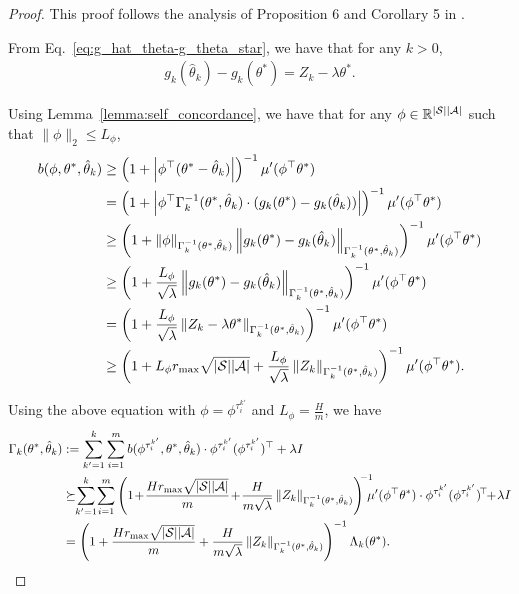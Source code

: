 \begin{proof}
	This proof follows the analysis of Proposition 6 and Corollary 5 in \cite{russac2021self}.
	
	From Eq.~\eqref{eq:g_hat_theta-g_theta_star}, we have that for any $k>0$,
	\begin{align*}
		g_k(\hat{\theta}_k) - g_k(\theta^*) = Z_k -  \lambda \theta^* .
	\end{align*}
	
	Using Lemma~\ref{lemma:self_concordance}, we have that for any $\phi \in \mathbb{R}^{|\mathcal{S}| |\mathcal{A}|}$ such that $\|\phi\|_2 \leq L_{\phi}$, 
	\begin{align*}
		b(\phi,\theta^*,\hat{\theta}_k) &\geq \left(  1+\left| \phi^\top (\theta^*-\hat{\theta}_k) \right|  \right)^{-1} \mu'(\phi^\top \theta^*)
		\\
		&= \left(  1+\left| \phi^\top \Gamma_k^{-1}(\theta^*,\hat{\theta}_k)\cdot (g_k(\theta^*)-g_k(\hat{\theta}_k)) \right|  \right)^{-1} \mu'(\phi^\top \theta^*)
		\\
		&\geq \left(  1+\left\| \phi \right\|_{ \Gamma_k^{-1}(\theta^*,\hat{\theta}_k)}  \left\| g_k(\theta^*)-g_k(\hat{\theta}_k) \right\|_{\Gamma_k^{-1}(\theta^*,\hat{\theta}_k)}  \right)^{-1} \mu'(\phi^\top \theta^*)
		\\
		&\geq \left(  1+\frac{L_{\phi}}{\sqrt{\lambda}} \left\| g_k(\theta^*)-g_k(\hat{\theta}_k) \right\|_{\Gamma_k^{-1}(\theta^*,\hat{\theta}_k)}  \right)^{-1} \mu'(\phi^\top \theta^*)
		\\
		&= \left(  1+\frac{L_{\phi}}{\sqrt{\lambda}} \left\|  Z_k-\lambda \theta^*  \right\|_{\Gamma_k^{-1}(\theta^*,\hat{\theta}_k)}  \right)^{-1} \mu'(\phi^\top \theta^*)
		\\
		&\geq \left(  1+ L_{\phi} r_{\max} \sqrt{|\mathcal{S}| |\mathcal{A}|}   + \frac{L_{\phi}}{\sqrt{\lambda}} \left\|  Z_k  \right\|_{\Gamma_k^{-1}(\theta^*,\hat{\theta}_k)}  \right)^{-1} \mu'(\phi^\top \theta^*) .
	\end{align*}
	
	Using the above equation with $\phi=\phi^{\tau^{k'}_i}$ and $L_{\phi}=\frac{H}{m}$, we have
	\begin{align*}
		\Gamma_k(\theta^*,\hat{\theta}_k)&:= \sum_{k'=1}^{k} \sum_{i=1}^{m} b(\phi^{\tau^{k'}_i},\theta^*,\hat{\theta}_k) \cdot \phi^{\tau^{k'}_i} (\phi^{\tau^{k'}_i})^\top + \lambda I 
		\\
		&\succeq \!\!\sum_{k'=1}^{k} \!\sum_{i=1}^{m} \sbr{ 1 \!+\!  \frac{H r_{\max} \sqrt{|\cS| |\cA|}}{m}   \!+\! \frac{H}{m\sqrt{\lambda}} \nbr{ Z_k }_{\Gamma_k^{-1}(\theta^*,\hat{\theta}_k)} }^{\!\!-1} \!\!\!\! \mu'(\phi^\top \theta^*) \cdot \phi^{\tau^{k'}_i} (\phi^{\tau^{k'}_i})^{\!\top} \!\!+\! \lambda I 
		\\
		&=  \sbr{ 1+  \frac{H r_{\max} \sqrt{|\cS| |\cA|}}{m}   + \frac{H}{m\sqrt{\lambda}} \nbr{ Z_k }_{\Gamma_k^{-1}(\theta^*,\hat{\theta}_k)} }^{-1} \Lambda_k(\theta^*) .
	\end{align*}
	

\end{proof}
